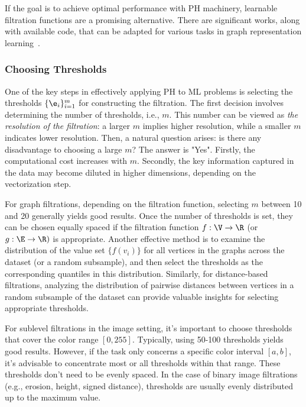 If the goal is to achieve optimal performance with PH machinery, learnable filtration functions are a promising alternative. There are significant works, along with available code, that can be adapted for various tasks in graph representation learning~\cite{hofer2020graph,zhang2022gefl}.


\subsubsection{Choosing Thresholds} \label{sec:threshold} One of the key steps in effectively applying PH to ML problems is selecting the thresholds $\{\e_i\}_{i=1}^m$ for constructing the filtration. The first decision involves determining the number of thresholds, i.e., $m$. This number can be viewed as \textit{the resolution of the filtration}: a larger $m$ implies higher resolution, while a smaller $m$ indicates lower resolution. Then, a natural question arises: is there any disadvantage to choosing a large $m$? The answer is "Yes". Firstly, the computational cost increases with $m$. Secondly, the key information captured in the data may become diluted in higher dimensions, depending on the vectorization step. 

For graph filtrations, depending on the filtration function, selecting $m$ between 10 and 20 generally yields good results. Once the number of thresholds is set, they can be chosen equally spaced if the filtration function $f: \V \to \R$ (or $g: \E \to \R)$ is appropriate. Another effective method is to examine the distribution of the value set $\{f(v_i)\}$ for all vertices in the graphs across the dataset (or a random subsample), and then select the thresholds as the corresponding quantiles in this distribution. Similarly, for distance-based filtrations, analyzing the distribution of pairwise distances between vertices in a random subsample of the dataset can provide valuable insights for selecting appropriate thresholds.



For sublevel filtrations in the image setting, it’s important to choose thresholds that cover the color range $[0,255]$. Typically, using 50-100 thresholds yields good results. However, if the task only concerns a specific color interval $[a,b]$, it’s advisable to concentrate most or all thresholds within that range. These thresholds don't need to be evenly spaced. In the case of binary image filtrations (e.g., erosion, height, signed distance), thresholds are usually evenly distributed up to the maximum value.


